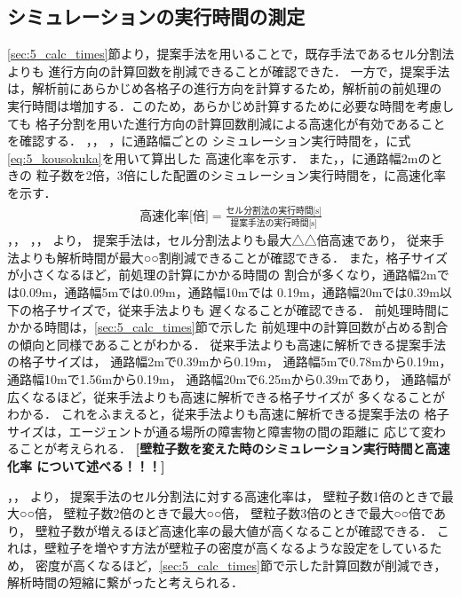 \subsection{シミュレーションの実行時間の測定}
\label{sec:5_calc_jikan}
\ref{sec:5_calc_times}節より，提案手法を用いることで，既存手法であるセル分割法よりも
進行方向の計算回数を削減できることが確認できた．
一方で，提案手法は，解析前にあらかじめ各格子の進行方向を計算するため，解析前の前処理の
実行時間は増加する．このため，あらかじめ計算するために必要な時間を考慮しても
格子分割を用いた進行方向の計算回数削減による高速化が有効であることを確認する．
，，
，に通路幅ごとの
シミュレーション実行時間を，に式\eqref{eq:5_kousokuka}を用いて算出した
高速化率を示す．
また，，に通路幅2mのときの
粒子数を2倍，3倍にした配置のシミュレーション実行時間を，に高速化率を示す．
%
\begin{align}
	\mbox{高速化率[倍]} = \frac{\mbox{セル分割法の実行時間[s]}}
    {\mbox{提案手法の実行時間[s]}}
    \label{eq:5_kousokuka}
\end{align}
%
，，
，，
より，
提案手法は，セル分割法よりも最大△△倍高速であり，
従来手法よりも解析時間が最大○○割削減できることが確認できる．
また，格子サイズが小さくなるほど，前処理の計算にかかる時間の
割合が多くなり，通路幅2mでは0.09m，通路幅5mでは0.09m，通路幅10mでは
0.19m，通路幅20mでは0.39m以下の格子サイズで，従来手法よりも
遅くなることが確認できる．
前処理時間にかかる時間は，\ref{sec:5_calc_times}節で示した
前処理中の計算回数が占める割合の傾向と同様であることがわかる．
従来手法よりも高速に解析できる提案手法の格子サイズは，
通路幅2mで0.39mから0.19m，
通路幅5mで0.78mから0.19m，
通路幅10mで1.56mから0.19m，
通路幅20mで6.25mから0.39mであり，
通路幅が広くなるほど，従来手法よりも高速に解析できる格子サイズが
多くなることがわかる．
これをふまえると，従来手法よりも高速に解析できる提案手法の
格子サイズは，エージェントが通る場所の障害物と障害物の間の距離に
応じて変わることが考えられる．
\textbf{[壁粒子数を変えた時のシミュレーション実行時間と高速化率
について述べる！！！]} 

，，
より，
提案手法のセル分割法に対する高速化率は，
壁粒子数1倍のときで最大○○倍，
壁粒子数2倍のときで最大○○倍，
壁粒子数3倍のときで最大○○倍であり，
壁粒子数が増えるほど高速化率の最大値が高くなることが確認できる．
これは，壁粒子を増やす方法が壁粒子の密度が高くなるような設定をしているため，
密度が高くなるほど，\ref{sec:5_calc_times}節で示した計算回数が削減でき，
解析時間の短縮に繋がったと考えられる．




